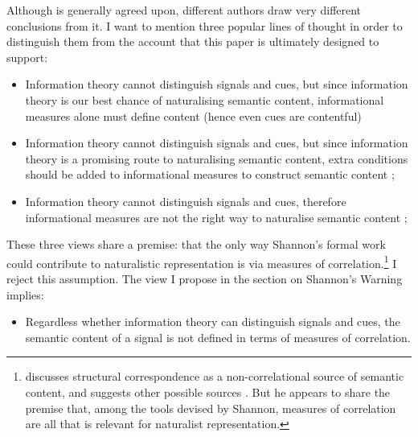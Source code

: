 


Although \ait{} is generally agreed upon, different authors draw very different conclusions from it.
I want to mention three popular lines of thought in order to distinguish them from the account that this paper is ultimately designed to support:

\begin{itemize}
    \item Information theory cannot distinguish signals and cues, but since information theory is our best chance of naturalising semantic content, informational measures alone must define content (hence even cues are contentful) \citep{skyrms2010signals,isaac2018semantics}
    \item Information theory cannot distinguish signals and cues, but since information theory is a promising route to naturalising semantic content, extra conditions should be added to informational measures to construct semantic content \citep[$\S$3-4]{shea2018representation}; \citep[pp. 6-9,34-36]{neander2017mark}
    \item Information theory cannot distinguish signals and cues, therefore informational measures are not the right way to naturalise semantic content \citep{lean2014shannon}; \citep[$\S$4]{hutto2013radicalizing} 
\end{itemize}

\noindent These three views share a premise: that the only way Shannon's formal work could contribute to naturalistic representation is via measures of correlation.\footnote{\citet[$\S$5]{shea2018representation} discusses structural correspondence as a non-correlational source of semantic content, and suggests other possible sources \citep[p. 76 n. 1]{shea2018representation}. But he appears to share the premise that, among the tools devised by Shannon, measures of correlation are all that is relevant for naturalist representation.}
I reject this assumption.
The view I propose in the section on Shannon's Warning implies:

\begin{itemize}
    \item Regardless whether information theory can distinguish signals and cues, the semantic content of a signal is not defined in terms of measures of correlation.
\end{itemize}

